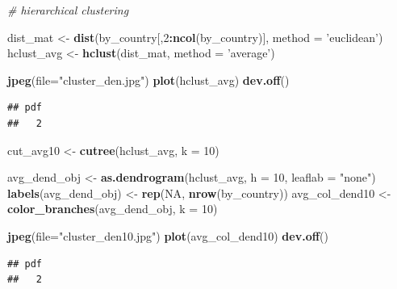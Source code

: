 \documentclass[]{article}
\newenvironment{Shaded}{\begin{snugshade}}{\end{snugshade}}
\newcommand{\CommentTok}[1]{\textcolor[rgb]{0.56,0.35,0.01}{\textit{#1}}}
\newcommand{\DataTypeTok}[1]{\textcolor[rgb]{0.13,0.29,0.53}{#1}}
\newcommand{\DecValTok}[1]{\textcolor[rgb]{0.00,0.00,0.81}{#1}}
\newcommand{\KeywordTok}[1]{\textcolor[rgb]{0.13,0.29,0.53}{\textbf{#1}}}
\newcommand{\NormalTok}[1]{#1}
\newcommand{\OperatorTok}[1]{\textcolor[rgb]{0.81,0.36,0.00}{\textbf{#1}}}
\newcommand{\OtherTok}[1]{\textcolor[rgb]{0.56,0.35,0.01}{#1}}
\newcommand{\StringTok}[1]{\textcolor[rgb]{0.31,0.60,0.02}{#1}}
\begin{document}
\begin{Shaded}
\begin{Highlighting}[]
\CommentTok{# hierarchical clustering}

\NormalTok{dist_mat <-}\StringTok{ }\KeywordTok{dist}\NormalTok{(by_country[,}\DecValTok{2}\OperatorTok{:}\KeywordTok{ncol}\NormalTok{(by_country)], }\DataTypeTok{method =} \StringTok{'euclidean'}\NormalTok{)}
\NormalTok{hclust_avg <-}\StringTok{ }\KeywordTok{hclust}\NormalTok{(dist_mat, }\DataTypeTok{method =} \StringTok{'average'}\NormalTok{)}

\KeywordTok{jpeg}\NormalTok{(}\DataTypeTok{file=}\StringTok{"cluster_den.jpg"}\NormalTok{)}
\KeywordTok{plot}\NormalTok{(hclust_avg)}
\KeywordTok{dev.off}\NormalTok{()}
\end{Highlighting}
\end{Shaded}

\begin{verbatim}
## pdf 
##   2
\end{verbatim}

\begin{Shaded}
\begin{Highlighting}[]
\NormalTok{cut_avg10 <-}\StringTok{ }\KeywordTok{cutree}\NormalTok{(hclust_avg, }\DataTypeTok{k =} \DecValTok{10}\NormalTok{)}

\NormalTok{avg_dend_obj <-}\StringTok{ }\KeywordTok{as.dendrogram}\NormalTok{(hclust_avg, }\DataTypeTok{h =} \DecValTok{10}\NormalTok{, }\DataTypeTok{leaflab =} \StringTok{"none"}\NormalTok{)}
\KeywordTok{labels}\NormalTok{(avg_dend_obj) <-}\StringTok{ }\KeywordTok{rep}\NormalTok{(}\OtherTok{NA}\NormalTok{, }\KeywordTok{nrow}\NormalTok{(by_country))}
\NormalTok{avg_col_dend10 <-}\StringTok{ }\KeywordTok{color_branches}\NormalTok{(avg_dend_obj, }\DataTypeTok{k =} \DecValTok{10}\NormalTok{)}

\KeywordTok{jpeg}\NormalTok{(}\DataTypeTok{file=}\StringTok{"cluster_den10.jpg"}\NormalTok{)}
\KeywordTok{plot}\NormalTok{(avg_col_dend10)}
\KeywordTok{dev.off}\NormalTok{()}
\end{Highlighting}
\end{Shaded}

\begin{verbatim}
## pdf 
##   2
\end{verbatim}
\end{document}
